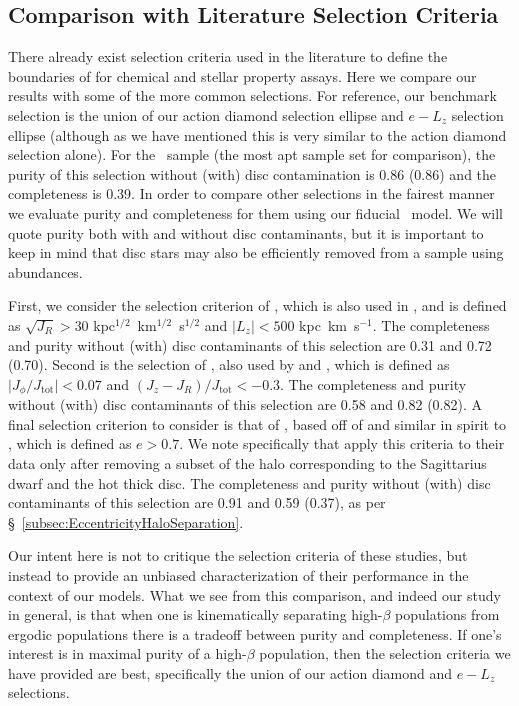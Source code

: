 \subsection{Comparison with Literature Selection Criteria}

There already exist selection criteria used in the literature to define the boundaries of \gse for chemical and stellar property assays. Here we compare our results with some of the more common selections. For reference, our benchmark selection is the union of our action diamond selection ellipse and $e-L_{z}$ selection ellipse (although as we have mentioned this is very similar to the action diamond selection alone). For the \survey\ sample (the most apt sample set for comparison), the purity of this selection without (with) disc contamination is 0.86 (0.86) and the completeness is 0.39. In order to compare other selections in the fairest manner we evaluate purity and completeness for them using our fiducial \survey\ model. We will quote purity both with and without disc contaminants, but it is important to keep in mind that disc stars may also be efficiently removed from a sample using abundances.

First, we consider the selection criterion of \textcite{feuillet20}, which is also used in \textcite{matsuno21}, and is defined as $\sqrt{J_{R}} > 30$ kpc$^{1/2}$~km$^{1/2}$~s$^{1/2}$ and $\lvert L_{z} \rvert < 500$ kpc~km~s$^{-1}$. The completeness and purity without (with) disc contaminants of this selection are 0.31 and 0.72 (0.70). Second is the selection of \textcite{myeong19}, also used by \textcite{monty20} and \textcite{cordoni20}, which is defined as $\lvert J_{\phi}/J_\mathrm{tot} \rvert < 0.07$ and $(J_{z}-J_{R})/J_\mathrm{tot} < -0.3$. The completeness and purity without (with) disc contaminants of this selection are 0.58 and 0.82 (0.82). A final selection criterion to consider is that of \textcite{naidu20}, based off of \textcite{belokurov18} and similar in spirit to \textcite{mackereth20}, which is defined as $e>0.7$. We note specifically that \textcite{naidu20} apply this criteria to their data only after removing a subset of the halo corresponding to the Sagittarius dwarf and the hot thick disc. The completeness and purity without (with) disc contaminants of this selection are 0.91 and 0.59 (0.37), as per \S~\ref{subsec:EccentricityHaloSeparation}.

Our intent here is not to critique the selection criteria of these studies, but instead to provide an unbiased characterization of their performance in the context of our models. What we see from this comparison, and indeed our study in general, is that when one is kinematically separating high-$\beta$ populations from ergodic populations there is a tradeoff between purity and completeness. If one's interest is in maximal purity of a high-$\beta$ population, then the selection criteria we have provided are best, specifically the union of our action diamond and $e-L_{z}$ selections.


